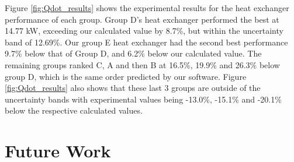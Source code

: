 \documentclass{article}
\begin{document}
Figure \ref{fig:Qdot_results} shows the experimental results for the heat exchanger performance of each group.
Group D's heat exchanger performed the best at 14.77 kW, exceeding our calculated value by 8.7\%, but within the uncertainty band of 12.69\%.
Our group E heat exchanger had the second best performance 9.7\% below that of Group D, and 6.2\% below our calculated value.
The remaining groups ranked C, A and then B at 16.5\%, 19.9\% and 26.3\% below group D, which is the same order predicted by our software.
Figure \ref{fig:Qdot_results} also shows that these last 3 groups are outside of the uncertainty bands with experimental values being
-13.0\%, -15.1\% and -20.1\% below the respective calculated values.


\newpage


\section{Future Work}
\end{document}
